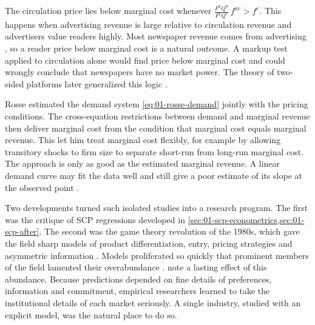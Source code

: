 The circulation price lies below marginal cost whenever $\frac{P^a Q^a}{P^c Q^c}\,f^{ac} > f^c$. This happens when
advertising revenue is large relative to circulation revenue and advertisers value readers highly. Most newspaper
revenue comes from advertising \citep[p.~1037]{Bresnahan1989}, so a reader price below marginal cost is a natural
outcome. A markup test applied to circulation alone would find price below marginal cost and could wrongly
conclude that newspapers have no market power. The theory of two-sided platforms later generalized this logic
\citep{RochetTirole2003,Armstrong2006}.

Rosse estimated the demand system \eqref{eq:01-rosse-demand} jointly with the pricing conditions. The
cross-equation restrictions between demand and marginal revenue then deliver marginal cost from the condition that
marginal cost equals marginal revenue. This let him treat marginal cost flexibly, for example by allowing transitory
shocks to firm size to separate short-run from long-run marginal cost. The approach is only as good as the estimated
marginal revenue. A linear demand curve may fit the data well and still give a poor estimate of its slope at the
observed point \citep[p.~1021]{Bresnahan1989}.

Two developments turned such isolated studies into a research program. The first was the critique of SCP regressions
developed in \cref{sec:01-scp-econometrics,sec:01-scp-after}. The second was the game theory revolution of the 1980s, which gave the field
sharp models of product differentiation, entry, pricing strategies and asymmetric information
\citep{Tirole1988}. Models proliferated so quickly that prominent members of the field lamented their overabundance
\citep{Fisher1989,Peltzman1991}. \citet[p.~146]{EinavLevin2010} note a lasting effect of this abundance. Because
predictions depended on fine details of preferences, information and commitment, empirical researchers learned to
take the institutional details of each market seriously. A single industry, studied with an explicit model, was the
natural place to do so.

